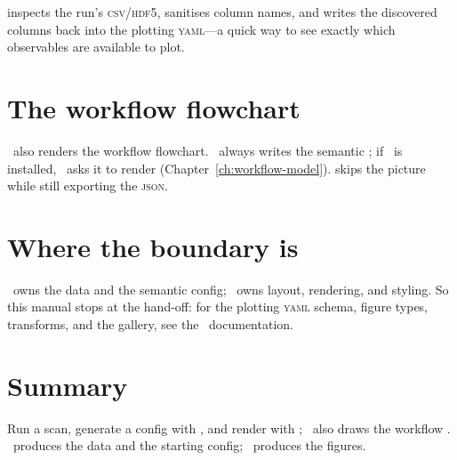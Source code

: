 \begin{jtip}
 inspects the run's \textsc{csv}/\textsc{hdf5}, sanitises column names,
and writes the discovered columns back into the plotting \textsc{yaml}---a quick way to see exactly
which observables are available to plot.
\end{jtip}

\section{The workflow flowchart}
\label{sec:plot-flowchart}

\JPlot\ also renders the workflow flowchart. \Jarvis\ always writes the semantic
; if \JPlot\ is installed, \Jarvis\ asks it to render
 (Chapter~\ref{ch:workflow-model}).  skips the
picture while still exporting the \textsc{json}.

\section{Where the boundary is}
\label{sec:plot-boundary}

\Jarvis\ owns the data and the semantic config; \JPlot\ owns layout, rendering, and styling. So
this manual stops at the hand-off: for the plotting \textsc{yaml} schema, figure types, transforms,
and the gallery, see the \JPlot\ documentation.

\section{Summary}
\label{sec:plot-summary}

Run a scan, generate a config with , and render with ; \JPlot\ also draws
the workflow . \Jarvis\ produces the data and the starting config; \JPlot\
produces the figures.
